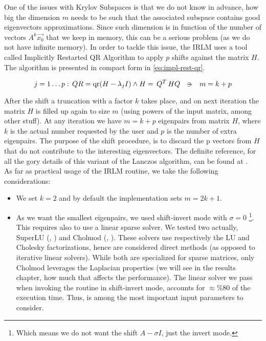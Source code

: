 One of the issues with Krylov Subspaces is that we do not know in
advance, how big the dimension $m$ needs to be such that the associated
subspace contains good eigenvectors approximations. Since such
dimension is in function of the number of vectors $A^k \vec{x_0}$ that
we keep in memory, this can be a serious problem (as we do not have
infinite memory). In order to tackle
this issue, the \gls{IRLM} uses a tool called Implicitly Restarted QR
Algorithm to apply $p$ shifts against the matrix $H$. The algorithm is
presented in compact form in \cref{eq:impl-rest-qr}.

\begin{equation}
  \label{eq:impl-rest-qr}
    j=1 \ldots p:\, QR = \func{qr}(H - \lambda_j I) \land H = \trans{Q}HQ
    \ds{\suchthat}
    m = k + p
\end{equation}
\joinbelow{1cm}

After the shift a truncation with a factor $k$ takes place, and on
next iteration the matrix $H$ is filled up again to size $m$ (using
powers of the input matrix, among other stuff). 
At any iteration we have $m = k + p$ eigenpairs from matrix $H$, where
$k$ is the actual number requested by the user and $p$ is the number
of extra eigenpairs. The purpose of the shift procedure, is to 
discard the p vectors from $H$ that do not contribute to the
interesting eigenvectors. The definite reference, for all the gory
details of this variant of the Lanczos algorithm, can be found at
\cite{arpack}. \\

As far as practical usage of the \gls{IRLM} routine, we take the following
considerations:

\begin{itemize}
\item We set $k=2$ and by default the implementation sets $m=2k+1$.
\item As we want the smallest eigenpairs, we used shift-invert mode
  with $\sigma=0$ \footnote{Which means we 
  do not want the shift $A - \sigma I$, just the invert mode.}. This
  requires also to use a linear sparse solver. We tested two actually, \gls{SuperLU}
  (\cite{superlu97}, \cite{superlu05}) and  \gls{Cholmod} (\cite{cholmod08},
  \cite{cholmod08a}). These solvers use respectively the LU and
  Cholesky factorizations, hence are considered direct
  methods (as opposed to iterative linear solvers). While
  both are specialized for sparse matrices, only \gls{Cholmod} leverages
  the \gls{Laplacian} properties (we will see in the results chapter, how much
  that affects the performance). The linear solver we pass when invoking the
  routine in shift-invert mode, accounts for $\approx \%80$ of
  the execution time. Thus, is among the most important input parameters
  to consider. 
\end{itemize}

